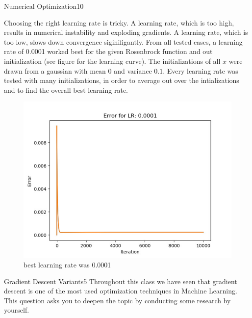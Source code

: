 \begin{questions}
\begin{question}{Numerical Optimization}{10}
\begin{answer}
	Choosing the right learning rate is tricky. A learning rate, which is too high, results in numerical instability and exploding gradients. A learning rate, which is too low, slows down convergence siginifigantly. From all tested cases, a learning rate of 0.0001 worked best for the given Rosenbrock function and out initialization (see figure \label{fig:LR_00001} for the learning curve). The initializations of all $x$ were drawn from a gaussian with mean $0$ and variance $0.1$. Every learning rate was tested with many initializations, in order to average out over the intializations and to find the overall best learning rate.
\end{answer}
\end{question}
\begin{figure}[h!]
	\includegraphics[width=12cm, scale=0.5]{00001.jpg}
	\caption{best learning rate was 0.0001}
	\label{fig:LR_00001}
\end{figure}




\begin{question}{Gradient Descent Variants}{5}
Throughout this class we have seen that gradient descent is one of the most used optimization techniques in Machine Learning. This question asks you to deepen the topic by conducting some research by yourself.


\end{question}
\end{questions}
